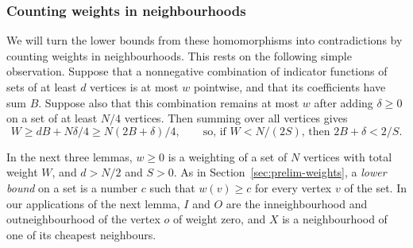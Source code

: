 \subsubsection{Counting weights in neighbourhoods}
We will turn the lower bounds from these homomorphisms into contradictions by counting weights in neighbourhoods. This rests on the following simple observation. Suppose that a nonnegative
combination of indicator functions of sets of at least $d$ vertices is at most $w$ pointwise, and that its coefficients have sum $B$. Suppose also that this combination remains at most $w$ after adding $\delta\ge0$ on a set of at least $N/4$ vertices. Then summing over all vertices gives
\begin{equation}\label{boundary:observation}
W\ge dB+N\delta/4\ge N(2B+\delta)/4,\qquad\text{so, if }W<N/(2S)\text{, then }2B+\delta<2/S.
\end{equation}

In the next three lemmas, $w\ge0$ is a weighting of a set of $N$ vertices with total weight $W$, and $d>N/2$ and $S>0$. As in Section~\ref{sec:prelim-weights}, a \emph{lower bound} on a set is a number $c$ such that $w(v)\ge c$ for every vertex $v$ of the set.
In our applications of the next lemma, $I$ and $O$ are the inneighbourhood and outneighbourhood of the vertex $o$ of weight zero, and $X$ is a neighbourhood of one of its cheapest neighbours.

